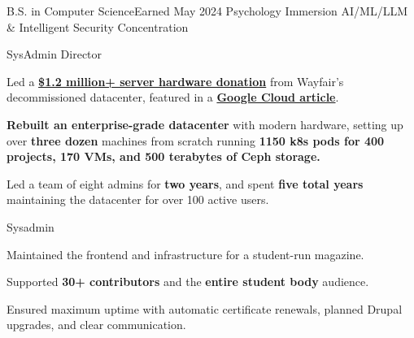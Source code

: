 \vspace{1.5pt} %

{B.S. in Computer Science}{Earned May 2024}
{Psychology Immersion}
{AI/ML/LLM \& Intelligent Security Concentration}

\cvtag{\LaTeX}

\smallskip


{
	{SysAdmin Director}    \hfill{}\newline
}
{
	\item{Led a \href{https://www.rit.edu/news/wayfair-gifts-850000-servers-rits-computer-science-house}{\textbf{\$1.2 million+ server hardware donation}} from Wayfair's decommissioned datacenter,} featured in a \href{https://cloud.google.com/blog/transform/wayfair-server-donation-mass-open-cloud-rit-student-innovation-johonnot}{\textbf{Google Cloud article}}.
	\item{\textbf{Rebuilt an enterprise-grade datacenter} with modern hardware, setting up over \textbf{three dozen} machines from scratch running \textbf{1150 k8s pods for 400 projects, 170 VMs, and 500 terabytes of Ceph storage.}}
	\item{Led a team of eight admins for \textbf{two years}, and spent \textbf{five total years} maintaining the datacenter for over 100 active users.}
}

{
	{Sysadmin} \hfill{}\newline
}
{
	\item{Maintained the frontend and infrastructure for a student-run magazine.}
	\item{Supported \textbf{30+ contributors} and the \textbf{entire student body} audience.}
	\item{Ensured maximum uptime with automatic certificate renewals, planned Drupal upgrades, and clear communication.}
}

